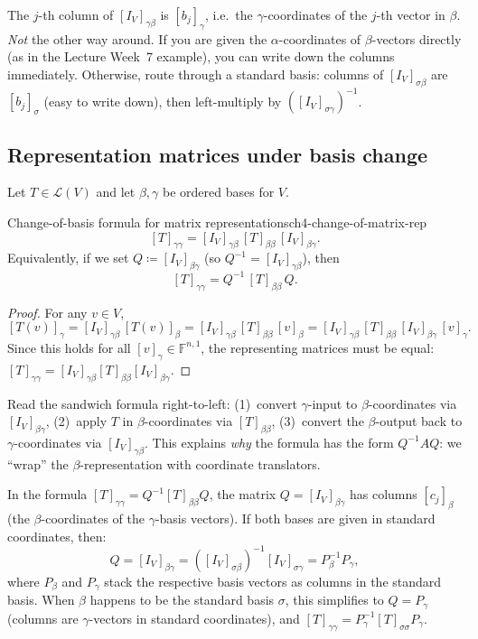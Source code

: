 \begin{examtip}[title={Exam Focus: ``read off columns'' rule for $[I_V]_{\gamma\beta}$}]
The $j$-th column of $[I_V]_{\gamma\beta}$ is $[b_j]_\gamma$, i.e.\ the $\gamma$-coordinates of the $j$-th vector in $\beta$.
\emph{Not} the other way around.
If you are given the $\alpha$-coordinates of $\beta$-vectors directly (as in the Lecture Week~7 example), you can write down the columns immediately.
Otherwise, route through a standard basis: columns of $[I_V]_{\sigma\beta}$ are $[b_j]_\sigma$ (easy to write down), then left-multiply by $([I_V]_{\sigma\gamma})^{-1}$.
\end{examtip}

\subsection{Representation matrices under basis change}

Let $T\in\mathcal{L}(V)$ and let $\beta,\gamma$ be ordered bases for $V$.

\begin{theorem}{Change-of-basis formula for matrix representations}{ch4-change-of-matrix-rep}
\[
[T]_{\gamma\gamma} = [I_V]_{\gamma\beta}\,[T]_{\beta\beta}\,[I_V]_{\beta\gamma}.
\]
Equivalently, if we set $Q\coloneqq [I_V]_{\beta\gamma}$ (so $Q^{-1}=[I_V]_{\gamma\beta}$), then
\[
[T]_{\gamma\gamma} = Q^{-1}\,[T]_{\beta\beta}\,Q.
\]
\end{theorem}

\begin{proof}
For any $v\in V$,
\[
[T(v)]_\gamma
=
[I_V]_{\gamma\beta}\,[T(v)]_\beta
=
[I_V]_{\gamma\beta}\,[T]_{\beta\beta}\,[v]_\beta
=
[I_V]_{\gamma\beta}\,[T]_{\beta\beta}\,[I_V]_{\beta\gamma}\,[v]_\gamma.
\]
Since this holds for all $[v]_\gamma\in\mathbb{F}^{n,1}$, the representing matrices must be equal:
$[T]_{\gamma\gamma}=[I_V]_{\gamma\beta}[T]_{\beta\beta}[I_V]_{\beta\gamma}$.
\end{proof}

Read the sandwich formula right-to-left: (1)~convert $\gamma$-input to $\beta$-coordinates via $[I_V]_{\beta\gamma}$, (2)~apply $T$ in $\beta$-coordinates via $[T]_{\beta\beta}$, (3)~convert the $\beta$-output back to $\gamma$-coordinates via $[I_V]_{\gamma\beta}$.
This explains \emph{why} the formula has the form $Q^{-1}AQ$: we ``wrap'' the $\beta$-representation with coordinate translators.

\begin{examtip}[title={Exam Focus: which $Q$ to use in $Q^{-1}[T]_{\beta\beta}Q$}]
In the formula $[T]_{\gamma\gamma}=Q^{-1}[T]_{\beta\beta}Q$, the matrix $Q=[I_V]_{\beta\gamma}$ has columns $[c_j]_\beta$ (the $\beta$-coordinates of the $\gamma$-basis vectors).
If both bases are given in standard coordinates, then:
\[
Q = [I_V]_{\beta\gamma} = ([I_V]_{\sigma\beta})^{-1}[I_V]_{\sigma\gamma} = P_\beta^{-1}P_\gamma,
\]
where $P_\beta$ and $P_\gamma$ stack the respective basis vectors as columns in the standard basis.
When $\beta$ happens to be the standard basis $\sigma$, this simplifies to $Q=P_\gamma$ (columns are $\gamma$-vectors in standard coordinates), and $[T]_{\gamma\gamma}=P_\gamma^{-1}[T]_{\sigma\sigma}P_\gamma$.
\end{examtip}

